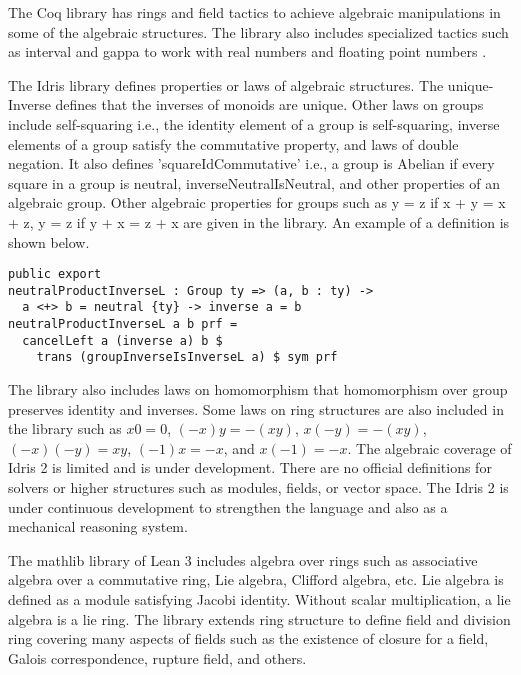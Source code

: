 The Coq library has rings and field tactics to achieve algebraic manipulations
in some of the algebraic structures. The library also includes specialized
tactics such as interval and gappa to work with real numbers and floating point
numbers \cite{Paulin-Mohring2012}. 

The Idris library defines properties or laws of algebraic structures. The
unique-Inverse defines that the inverses of monoids are unique. Other laws on
groups include self-squaring i.e., the identity element of a group is
self-squaring, inverse elements of a group satisfy the commutative property, and
laws of double negation. It also defines 'squareIdCommutative' i.e., a group is
Abelian if every square in a group is neutral, inverseNeutralIsNeutral, and
other properties of an algebraic group. Other algebraic properties for groups
such as y = z if x + y = x + z, y = z if y + x = z + x are given in the library.
An example of a definition is shown below.

\begin{verbatim}
public export
neutralProductInverseL : Group ty => (a, b : ty) ->
  a <+> b = neutral {ty} -> inverse a = b
neutralProductInverseL a b prf =
  cancelLeft a (inverse a) b $
    trans (groupInverseIsInverseL a) $ sym prf
\end{verbatim}

The library also includes laws on homomorphism that homomorphism over group
preserves identity and inverses. Some laws on ring structures are also included
in the library such as $x0 = 0$, $(-x)y = -(xy)$, $x(-y) = -(xy)$, $(-x)(-y) =
xy$, $(-1)x = -x$, and $x(-1) = -x$. The algebraic coverage of Idris 2 is
limited and is under development. There are no official definitions for solvers
or higher structures such as modules, fields, or vector space. The Idris 2 is
under continuous development to strengthen the language and also as a mechanical
reasoning system. 

The mathlib library of Lean 3 includes algebra over rings such as associative
algebra over a commutative ring, Lie algebra, Clifford algebra, etc. Lie algebra
is defined as a module satisfying Jacobi identity. Without scalar
multiplication, a lie algebra is a lie ring. The library extends ring structure
to define field and division ring covering many aspects of fields such as the
existence of closure for a field, Galois correspondence, rupture field, and
others.